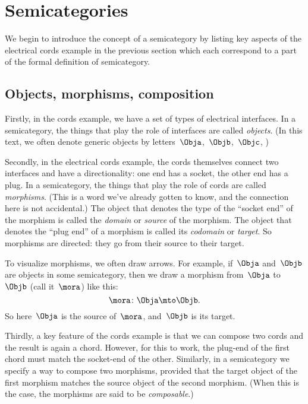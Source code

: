 
\section[Semicategories]{Semicategories}
\label{sec:formal-def-semicat}


We begin to introduce the concept of a semicategory by listing key aspects of the electrical cords example in the previous section which each correspond to a part of the formal definition of semicategory.

\subsection{Objects, morphisms, composition}

Firstly, in the cords example, we have a set of types of electrical interfaces.
In a semicategory, the things that play the role of interfaces are called \emph{objects}.
(In this text, we often denote generic objects by letters~$\Obja$,~$\Objb$,~$\Objc$, \etc)

Secondly, in the electrical cords example, the cords themselves connect two interfaces and have a directionality: one end has a socket, the other end has a plug.
In a semicategory, the things that play the role of cords are called \emph{morphisms}.
(This is a word we've already gotten to know, and the connection here is not accidental.) The object that denotes the type of the ``socket end'' of the morphism is called the \emph{domain} or \emph{source} of the morphism.
The object that denotes the ``plug end'' of a morphism is called its \emph{codomain} or \emph{target}.
So morphisms are directed: they go from their source to their target.

To visualize morphisms, we often draw arrows.
For example, if~$\Obja$ and~$\Objb$ are objects in some semicategory, then we draw a morphism from~$\Obja$ to~$\Objb$ (call it~$\mora$) like this:
\begin{equation}
    \mora\colon \Obja \mto \Objb.
\end{equation}
So here~$\Obja$ is the source of~$\mora$, and~$\Objb$ is its target.

Thirdly, a key feature of the cords example is that we can compose two cords and the result is again a chord.
However, for this to work, the plug-end of the first chord must match the socket-end of the other.
Similarly, in a semicategory we specify a way to compose two morphisms, provided that the target object of the first morphism matches the source object of the second morphism.
(When this is the case, the morphisms are said to be \emph{composable}.)

